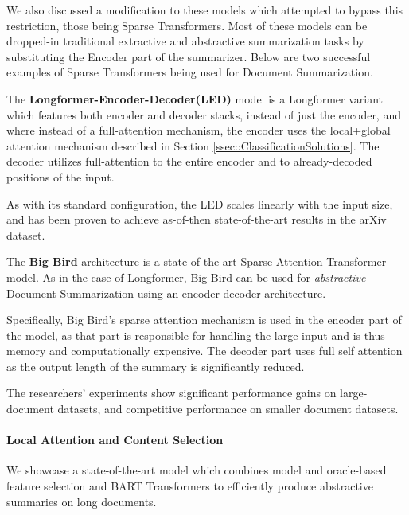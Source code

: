 \documentclass[preprint,review,12pt]{elsarticle}
\begin{document}
We also discussed a modification to these models which attempted to bypass this restriction, those being Sparse Transformers. Most of these models can be dropped-in traditional extractive and abstractive summarization tasks by substituting the Encoder part of the summarizer. Below are two successful examples of Sparse Transformers being used for Document Summarization.

The \textbf{Longformer-Encoder-Decoder(LED)} model is a Longformer variant which features both encoder and decoder stacks, instead of just the encoder, and where instead of a full-attention mechanism, the encoder uses the local+global attention mechanism described in Section \ref{ssec::ClassificationSolutions}. The decoder utilizes full-attention to the entire encoder and to already-decoded positions of the input. 

As with its standard configuration, the LED scales linearly with the input size, and has been proven to achieve as-of-then state-of-the-art results in the arXiv dataset.

The \textbf{Big Bird} architecture \cite{big_bird} is a state-of-the-art Sparse Attention Transformer model. As in the case of Longformer, Big Bird can be used for \textit{abstractive} Document Summarization using an encoder-decoder architecture.

Specifically, Big Bird's sparse attention mechanism is used in the encoder part of the model, as that part is responsible for handling the large input and is thus memory and computationally expensive. The decoder part uses full self attention as the output length of the summary is significantly reduced.

The researchers' experiments show significant performance gains on large-document datasets, and competitive performance on smaller document datasets.


\paragraph{Local Attention and Content Selection} We showcase a state-of-the-art model which combines model and oracle-based feature selection and BART Transformers to efficiently produce abstractive summaries on long documents.

\end{document}
